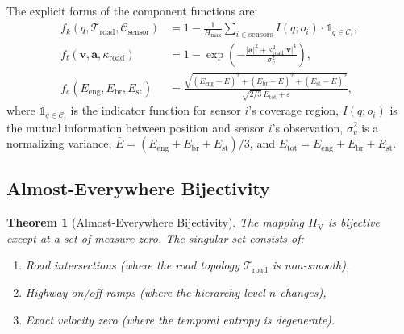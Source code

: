 \documentclass[twocolumn,10pt]{article}
\newtheorem{theorem}{Theorem}[section]
\newcommand{\PiV}{\Pi_{\mathrm{V}}}
\newcommand{\Hmax}{H_{\mathrm{max}}}
\begin{document}
The explicit forms of the component functions are:
\begin{align}
f_k(q, \mathcal{T}_{\mathrm{road}}, \mathcal{C}_{\mathrm{sensor}}) &= 1 - \frac{1}{\Hmax} \sum_{i \in \mathrm{sensors}} I(q; o_i) \cdot \mathbb{1}_{q \in \mathcal{C}_i}, \label{eq:fk_explicit}\\
f_t(\mathbf{v}, \mathbf{a}, \kappa_{\mathrm{road}}) &= 1 - \exp\left(-\frac{|\mathbf{a}|^2 + \kappa_{\mathrm{road}}^2 |\mathbf{v}|^4}{\sigma_v^2}\right), \label{eq:ft_explicit}\\
f_e(E_{\mathrm{eng}}, E_{\mathrm{br}}, E_{\mathrm{st}}) &= \frac{\sqrt{(E_{\mathrm{eng}} - \bar{E})^2 + (E_{\mathrm{br}} - \bar{E})^2 + (E_{\mathrm{st}} - \bar{E})^2}}{\sqrt{2/3}\, E_{\mathrm{tot}} + \varepsilon}, \label{eq:fe_explicit}
\end{align}
where $\mathbb{1}_{q \in \mathcal{C}_i}$ is the indicator function for sensor $i$'s coverage region, $I(q; o_i)$ is the mutual information between position and sensor $i$'s observation, $\sigma_v^2$ is a normalizing variance, $\bar{E} = (E_{\mathrm{eng}} + E_{\mathrm{br}} + E_{\mathrm{st}})/3$, and $E_{\mathrm{tot}} = E_{\mathrm{eng}} + E_{\mathrm{br}} + E_{\mathrm{st}}$.

\subsection{Almost-Everywhere Bijectivity}

\begin{theorem}[Almost-Everywhere Bijectivity]\label{thm:bijective}
The mapping $\PiV$ is bijective except at a set of measure zero. The singular set consists of:
\begin{enumerate}
    \item Road intersections (where the road topology $\mathcal{T}_{\mathrm{road}}$ is non-smooth),
    \item Highway on/off ramps (where the hierarchy level $n$ changes),
    \item Exact velocity zero (where the temporal entropy is degenerate).
\end{enumerate}
\end{theorem}
\end{document}
